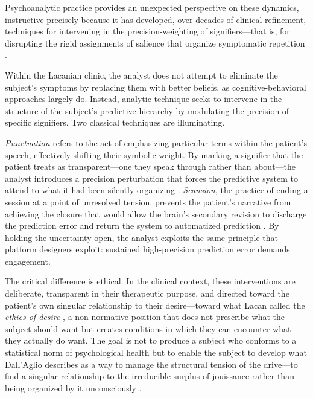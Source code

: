 \documentclass[12pt,a4paper]{article}
\begin{document}
Psychoanalytic practice provides an unexpected perspective on these dynamics, instructive
precisely because it has developed, over decades of clinical refinement, techniques for
intervening in the precision-weighting of signifiers---that is, for disrupting the rigid
assignments of salience that organize symptomatic repetition \citep{lacan2006,dallaglio2024}.

Within the Lacanian clinic, the analyst does not attempt to eliminate the subject's symptoms
by replacing them with better beliefs, as cognitive-behavioral approaches largely do. Instead,
analytic technique seeks to intervene in the structure of the subject's predictive hierarchy
by modulating the precision of specific signifiers. Two classical techniques are illuminating.

\emph{Punctuation} refers to the act of emphasizing particular terms within the patient's
speech, effectively shifting their symbolic weight. By marking a signifier that the patient
treats as transparent---one they speak through rather than about---the analyst introduces a
precision perturbation that forces the predictive system to attend to what it had been silently
organizing \citep{lacan2006}. \emph{Scansion}, the practice of ending a session at a point of
unresolved tension, prevents the patient's narrative from achieving the closure that would allow
the brain's secondary revision to discharge the prediction error and return the system to
automatized prediction \citep{dallaglio2024}. By holding the uncertainty open, the analyst
exploits the same principle that platform designers exploit: sustained high-precision prediction
error demands engagement.

The critical difference is ethical. In the clinical context, these interventions are deliberate,
transparent in their therapeutic purpose, and directed toward the patient's own singular
relationship to their desire---toward what Lacan called the \emph{ethics of desire} \citep{lacan2006},
a non-normative position that does not prescribe what the subject should want but creates
conditions in which they can encounter what they actually do want. The goal is not to produce a
subject who conforms to a statistical norm of psychological health but to enable the subject to
develop what Dall'Aglio describes as a way to manage the structural tension of the drive---to
find a singular relationship to the irreducible surplus of jouissance rather than being
organized by it unconsciously \citep{dallaglio2024}.
\end{document}
